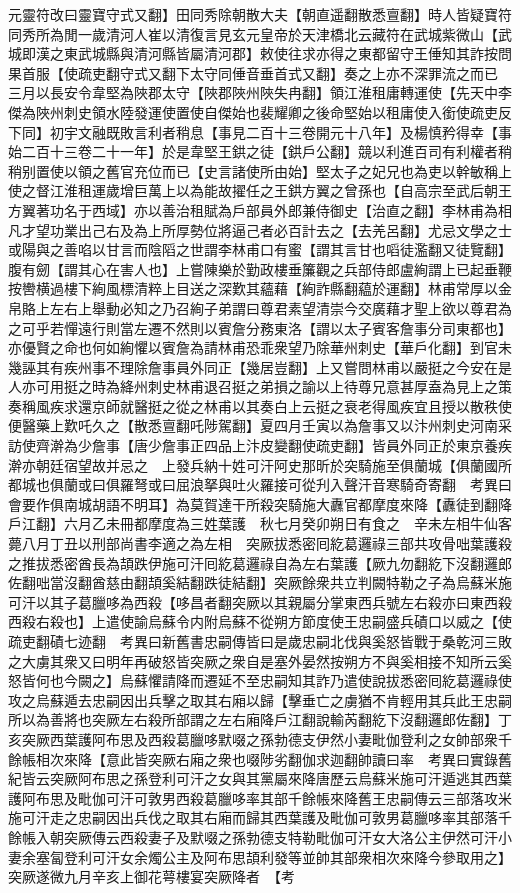 元靈符改曰靈寶守式又翻】田同秀除朝散大夫【朝直遥翻散悉亶翻】時人皆疑寶符同秀所為閒一歲清河人崔以清復言見玄元皇帝於天津橋北云藏符在武城紫微山【武城即漢之東武城縣與清河縣皆屬清河郡】敕使往求亦得之東都留守王倕知其詐按問果首服【使疏吏翻守式又翻下太守同倕音垂首式又翻】奏之上亦不深罪流之而已　三月以長安令韋堅為陜郡太守【陜郡陜州陜失冉翻】領江淮租庸轉運使【先天中李傑為陜州刺史領水陸發運使置使自傑始也裴耀卿之後命堅始以租庸使入銜使疏吏反下同】初宇文融既敗言利者稍息【事見二百十三卷開元十八年】及楊慎矜得幸【事始二百十三卷二十一年】於是韋堅王鉷之徒【鉷戶公翻】競以利進百司有利權者稍稍别置使以領之舊官充位而已【史言諸使所由始】堅太子之妃兄也為吏以幹敏稱上使之督江淮租運歲增巨萬上以為能故擢任之王鉷方翼之曾孫也【自高宗至武后朝王方翼著功名于西域】亦以善治租賦為戶部員外郎兼侍御史【治直之翻】李林甫為相凡才望功業出己右及為上所厚勢位將逼己者必百計去之【去羌呂翻】尤忌文學之士或陽與之善啗以甘言而陰䧟之世謂李林甫口有蜜【謂其言甘也㗖徒濫翻又徒覽翻】腹有劒【謂其心在害人也】上嘗陳樂於勤政樓垂簾觀之兵部侍郎盧絢謂上已起垂鞭按轡横過樓下絢風標清粹上目送之深歎其蘊藉【絢詐縣翻藴於運翻】林甫常厚以金帛賂上左右上舉動必知之乃召絢子弟謂曰尊君素望清崇今交廣藉才聖上欲以尊君為之可乎若憚遠行則當左遷不然則以賓詹分務東洛【謂以太子賓客詹事分司東都也】亦優賢之命也何如絢懼以賓詹為請林甫恐乖衆望乃除華州刺史【華戶化翻】到官未幾誣其有疾州事不理除詹事員外同正【幾居豈翻】上又嘗問林甫以嚴挺之今安在是人亦可用挺之時為絳州刺史林甫退召挺之弟損之諭以上待尊兄意甚厚盍為見上之策奏稱風疾求還京師就醫挺之從之林甫以其奏白上云挺之衰老得風疾宜且授以散秩使便醫藥上歎吒久之【散悉亶翻吒陟駕翻】夏四月壬寅以為詹事又以汴州刺史河南采訪使齊澣為少詹事【唐少詹事正四品上汴皮變翻使疏吏翻】皆員外同正於東京養疾澣亦朝廷宿望故并忌之　上發兵納十姓可汗阿史那昕於突騎施至俱蘭城【俱蘭國所都城也俱蘭或曰俱羅弩或曰屈浪拏與吐火羅接可從刋入聲汗音寒騎奇寄翻　考異曰會要作俱南城胡語不明耳】為莫賀達干所殺突騎施大纛官都摩度來降【纛徒到翻降戶江翻】六月乙未冊都摩度為三姓葉護　秋七月癸卯朔日有食之　辛未左相牛仙客薨八月丁丑以刑部尚書李適之為左相　突厥拔悉密囘紇葛邏祿三部共攻骨咄葉護殺之推拔悉密酋長為頡跌伊施可汗囘紇葛邏祿自為左右葉護【厥九勿翻紇下沒翻邏郎佐翻咄當沒翻酋慈由翻頡奚結翻跌徒結翻】突厥餘衆共立判闕特勒之子為烏蘇米施可汗以其子葛臘哆為西殺【哆昌者翻突厥以其親屬分掌東西兵號左右殺亦曰東西殺西殺右殺也】上遣使諭烏蘇令内附烏蘇不從朔方節度使王忠嗣盛兵磧口以威之【使疏吏翻磧七迹翻　考異曰新舊書忠嗣傳皆曰是歲忠嗣北伐與奚怒皆戰于桑乾河三敗之大虜其衆又曰明年再破怒皆突厥之衆自是塞外晏然按朔方不與奚相接不知所云奚怒皆何也今闕之】烏蘇懼請降而遷延不至忠嗣知其詐乃遣使說拔悉密囘紇葛邏祿使攻之烏蘇遁去忠嗣因出兵擊之取其右廂以歸【擊垂亡之虜猶不肯輕用其兵此王忠嗣所以為善將也突厥左右殺所部謂之左右廂降戶江翻說輸芮翻紇下沒翻邏郎佐翻】丁亥突厥西葉護阿布思及西殺葛臘哆默啜之孫勃德支伊然小妻毗伽登利之女帥部衆千餘帳相次來降【意此皆突厥右廂之衆也啜陟劣翻伽求迦翻帥讀曰率　考異曰實錄舊紀皆云突厥阿布思之孫登利可汗之女與其黨屬來降唐歷云烏蘇米施可汗遁逃其西葉護阿布思及毗伽可汗可敦男西殺葛臘哆率其部千餘帳來降舊王忠嗣傳云三部落攻米施可汗走之忠嗣因出兵伐之取其右廂而歸其西葉護及毗伽可敦男葛臘哆率其部落千餘帳入朝突厥傳云西殺妻子及默啜之孫勃德支特勒毗伽可汗女大洛公主伊然可汗小妻余塞匐登利可汗女余燭公主及阿布思頡利發等並帥其部衆相次來降今參取用之】突厥遂微九月辛亥上御花萼樓宴突厥降者　【考